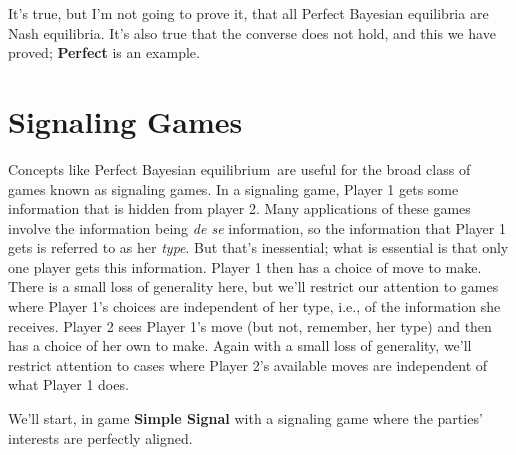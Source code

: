 \documentclass[openany]{book}
\newcommand{\eqm}{equilibrium}
\begin{document}
It's true, but I'm not going to prove it, that all Perfect Bayesian equilibria are Nash equilibria. It's also true that the converse does not hold, and this we have proved; \textbf{Perfect} is an example.

\section{Signaling Games}

Concepts like Perfect Bayesian \eqm\ are useful for the broad class of games known as signaling games. In a signaling game, Player 1 gets some information that is hidden from player 2. Many applications of these games involve the information being \textit{de se} information, so the information that Player 1 gets is referred to as her \textit{type}. But that's inessential; what is essential is that only one player gets this information. Player 1 then has a choice of move to make. There is a small loss of generality here, but we'll restrict our attention to games where Player 1's choices are independent of her type, i.e., of the information she receives. Player 2 sees Player 1's move (but not, remember, her type) and then has a choice of her own to make. Again with a small loss of generality, we'll restrict attention to cases where Player 2's available moves are independent of what Player 1 does. 

We'll start, in game \textbf{Simple Signal} with a signaling game where the parties' interests are perfectly aligned.
\end{document}
